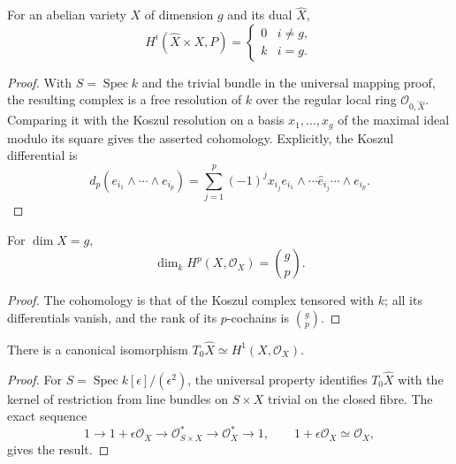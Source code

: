 \begin{corollary}
\label{mumford-cor-poincare-cohomology}
For an abelian variety $X$ of dimension $g$ and its dual $\widehat X$,
\[
H^i(\widehat X\times X,P)=
\begin{cases}0&i\ne g,\\ k&i=g.\end{cases}
\]
\end{corollary}
\begin{proof}
With $S=\operatorname{Spec}k$ and the trivial bundle in the universal
mapping proof, the resulting complex is a free resolution of $k$ over the
regular local ring $\mathcal O_{0,\widehat X}$. Comparing it with the
Koszul resolution on a basis $x_1,\ldots,x_g$ of the maximal ideal modulo
its square gives the asserted cohomology. Explicitly, the Koszul differential
is
\[
d_p(e_{i_1}\wedge\cdots\wedge e_{i_p})=
\sum_{j=1}^p(-1)^j x_{i_j}e_{i_1}\wedge\cdots\widehat e_{i_j}\cdots\wedge e_{i_p}.
\]
\end{proof}

\begin{corollary}
\label{mumford-cor-structure-sheaf-cohomology}
For $\dim X=g$,
\[
\dim_kH^p(X,\mathcal O_X)=\binom gp.
\]
\end{corollary}
\begin{proof}
The cohomology is that of the Koszul complex tensored with $k$; all its
differentials vanish, and the rank of its $p$-cochains is $\binom gp$.
\end{proof}

\begin{corollary}
\label{mumford-cor-tangent-dual-h1}
There is a canonical isomorphism
$T_0\widehat X\simeq H^1(X,\mathcal O_X)$.
\end{corollary}
\begin{proof}
For $S=\operatorname{Spec}k[\epsilon]/(\epsilon^2)$, the universal property
identifies $T_0\widehat X$ with the kernel of restriction from line bundles
on $S\times X$ trivial on the closed fibre. The exact sequence
\[
1\to1+\epsilon\mathcal O_X\to\mathcal O_{S\times X}^*\to
\mathcal O_X^*\to1,
\qquad1+\epsilon\mathcal O_X\simeq\mathcal O_X,
\]
gives the result.
\end{proof}

